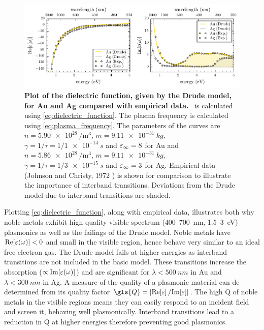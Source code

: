 \documentclass{article}
\begin{document}
\begin{figure}[bt]
\centering
\includegraphics{figures/dielectric_function}
\caption[Plot of the dielectric function, given by the Drude model, for Au and Ag compared with empirical data]{\textbf{Plot of the dielectric function, given by the Drude model, for Au and Ag compared with empirical data.} \dielectric\ is calculated using \eqref{eq:dielectric_function}. The plasma frequency is calculated using \eqref{eq:plasma_frequency}. The parameters of the curves are $n=\SI{5.90e28}{\per\metre\cubed}$, $m=\SI{9.11e-31}{kg}$, $\gamma=1/\tau=1/\SI{1e-14}{s}$ and $\varepsilon_\infty = 8$ for Au and $n=\SI{5.86e28}{\per\metre\cubed}$, $m=\SI{9.11e-31}{kg}$, $\gamma=1/\tau=1/\SI{3e-15}{s}$ and $\varepsilon_\infty = 3$ for Ag. Empirical data (Johnson and Christy, 1972 \cite{johnson1972optical}) is shown for comparison to illustrate the importance of interband transitions. Deviations from the Drude model due to interband transitions are shaded.}
\label{fig:dielectric_function}
\end{figure}

Plotting \eqref{eq:dielectric_function}, along with empirical data, illustrates both why noble metals exhibit high quality visible spectrum (400--\SI{700}{nm}, 1.5--\SI{3}{eV}) plasmonics as well as the failings of the Drude model. Noble metals have $\mathrm{Re}\!\left[{\varepsilon(\omega)}\right]<0$ and small \imag{\dielectric} in the visible region, hence behave very similar to an ideal free electron gas. The Drude model fails at higher energies as interband transitions are not included in the basic model. These transitions increase the absorption ($\propto\mathrm{Im}\!\left[{\varepsilon(\omega)}\right]$) and are significant for $\lambda < \SI{500}{nm}$ in Au and $\lambda<\SI{300}{nm}$ in Ag. A measure of the quality of a plasmonic material can de determined from its quality factor $\gls{Q} = \left|\real{\eps}/\imag{\eps}\right|$. The high \gls{Q} of noble metals in the visible regions means they can easily respond to an incident field and screen it, behaving well plasmonically. Interband transitions lead to a reduction in \gls{Q} at higher energies therefore preventing good plasmonics.
\end{document}
